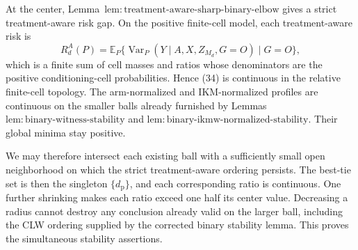 At the center, Lemma~\(\mathrm{lem{:}treatment\text{-}aware\text{-}sharp\text{-}binary\text{-}elbow}\) gives a strict treatment-aware risk gap.  On the positive finite-cell model, each treatment-aware risk is
\[
 R_d^A(P)=\mathbb E_P\{\operatorname{Var}_P(Y\mid A,X,Z_{M_d},G=O)\mid G=O\}, \tag{34}
\]
which is a finite sum of cell masses and ratios whose denominators are the positive conditioning-cell probabilities.  Hence (34) is continuous in the relative finite-cell topology.  The arm-normalized and IKM-normalized profiles are continuous on the smaller balls already furnished by Lemmas~\(\mathrm{lem{:}binary\text{-}witness\text{-}stability}\) and \(\mathrm{lem{:}binary\text{-}ikmw\text{-}normalized\text{-}stability}\).  Their global minima stay positive.

We may therefore intersect each existing ball with a sufficiently small open neighborhood on which the strict treatment-aware ordering persists.  The best-tie set is then the singleton \(\{d_{\mathrm p}\}\), and each corresponding ratio is continuous.  One further shrinking makes each ratio exceed one half its center value.  Decreasing a radius cannot destroy any conclusion already valid on the larger ball, including the CLW ordering supplied by the corrected binary stability lemma.  This proves the simultaneous stability assertions.